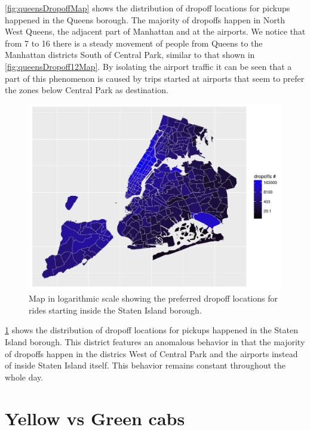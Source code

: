 \documentclass{acm_proc_article-sp-sigmod09}
\begin{document}
\cref{fig:queensDropoffMap} shows the distribution of dropoff locations for pickups happened in the Queens borough. The majority of dropoffs happen in North West Queens, the adjacent part of Manhattan and at the airports. We notice that from 7 to 16 there is a steady movement of people from Queens to the Manhattan districts South of Central Park, similar to that shown in \cref{fig:queensDropoff12Map}. By isolating the airport traffic it can be seen that a part of this phenomenon is caused by trips started at airports that seem to prefer the zones below Central Park as destination.

\begin{figure}
	\centering
	\includegraphics[width=1\columnwidth]{resources/base_plots/staten_island_dropoff_location_id_dist_map.pdf}
	\caption{Map in logarithmic scale showing the preferred dropoff locations for rides starting inside the Staten Island borough.}
	\label{fig:statenIslandDropoffMap}
\end{figure}

\cref{fig:statenIslandDropoffMap} shows the distribution of dropoff locations for pickups happened in the Staten Island borough. This district features an anomalous behavior in that the majority of dropoffs happen in the districs West of Central Park and the airports instead of inside Staten Island itself. This behavior remains constant throughout the whole day.

\section{Yellow vs Green cabs}
\end{document}
